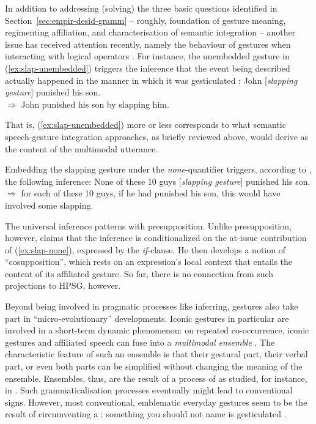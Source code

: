 \documentclass[output=paper]{langsci/langscibook}
\begin{document}
In addition to addressing (solving) the three basic questions identified in Section~\ref{sec:empir-desid-gramm} -- roughly, foundation of gesture meaning, regimenting affiliation, and characterisation of semantic integration -- another issue has received attention recently, namely the  behaviour of gestures when interacting with logical operators \citep{Ebert:2014:a,Schlenker:2018}.
%
For instance, the unembedded gesture in (\ref{ex:slap-unembedded}) triggers the inference that the event being described actually happened in the manner in which it was gesticulated \citep[]{Schlenker:2018}:
%
\ea \label{ex:slap-unembedded}
John [\textit{slapping gesture}] punished his son. \\
$\Rightarrow$ John punished his son by slapping him.
\z

That is, (\ref{ex:slap-unembedded}) more or less corresponds to what semantic speech-gesture integration approaches, as briefly reviewed above, would derive as the content of the multimodal utterance.

Embedding the slapping gesture under the \textit{none}-quantifier triggers, according to \citet[]{Schlenker:2018}, the following inference:
%
\ea \label{ex:slap-none}
None of these 10 guys [\textit{slapping gesture}] punished his son. \\
$\Rightarrow$ for each of these 10 guys, if he had punished his son, this would have involved some slapping.
\z

The universal inference patterns with presupposition.
%
Unlike presupposition, however, \citet[]{Schlenker:2018} claims that the inference is conditionalized on the at-issue contribution of (\ref{ex:slap-none}), expressed by the \textit{if}-clause. 
%
He then develops a notion of \enquote{cosupposition},  which rests on an expression's local context that entails the content of its affiliated gesture.
%
So far, there is no connection from such projections to HPSG, however.


Beyond being involved in pragmatic processes like inferring, gestures also take part in \enquote{micro-evolutionary} developments.
%
Iconic gestures in particular are involved in a short-term dynamic phenomenon:
%
on repeated co-occurrence, iconic gestures and affiliated speech can fuse into a \emph{multimodal ensemble} \citep{Kendon:2004,Luecking:Mehler:Menke:2008,Mehler:Luecking:2012:d}.  
%
The characteristic feature of such an ensemble is that their gestural part, their verbal part, or even both parts can be simplified without changing the meaning of the ensemble.
%
Ensembles, thus, are the result of a process of  as studied, for instance, in  \citep{Galantucci:Garrod:2011}.
%
Such grammaticalisation processes  eventually might lead to conventional signs.
%
However, most conventional, emblematic everyday gestures seem to be the result of circumventing a : something you should not name is gesticulated \citep{Posner:2002}. 
 
\end{document}
